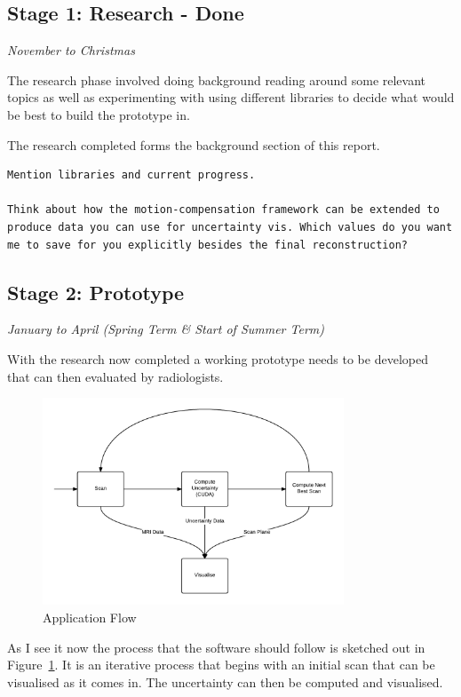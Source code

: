 \documentclass[
  oneside,
  11pt, a4paper,
  footinclude=true,
  headinclude=true,
  cleardoublepage=empty
]{scrbook}
\begin{document}
\subsection*{Stage 1: Research - Done}
\textit{November to Christmas}

The research phase involved doing background reading around some relevant topics as well as experimenting with using different libraries to decide what would be best to build the prototype in.

The research completed forms the background section of this report.

\begin{verbatim}
Mention libraries and current progress.

Think about how the motion-compensation framework can be extended to produce data you can use for uncertainty vis. Which values do you want me to save for you explicitly besides the final reconstruction?
\end{verbatim}

\subsection*{Stage 2: Prototype}
\textit{January to April (Spring Term \& Start of Summer Term)}

With the research now completed a working prototype needs to be developed that can then evaluated by radiologists.

\begin{figure}[h]
    \centering
	\includegraphics[width=0.8\textwidth]{images/flowchart.png}
    \caption{Application Flow}
    \label{fig:flowchart}
\end{figure}

As I see it now the process that the software should follow is sketched out in Figure~\ref{fig:flowchart}. It is an iterative process that begins with an initial scan that can be visualised as it comes in. The uncertainty can then be computed and visualised.
\end{document}
